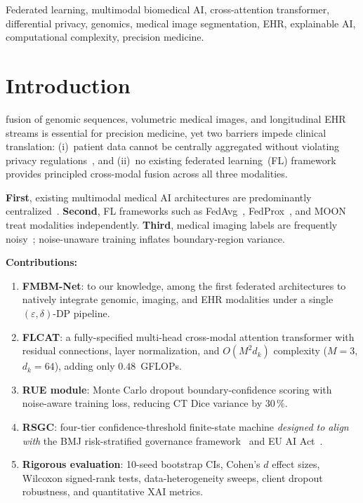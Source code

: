 \documentclass[journal,draftclsnofoot,10pt,onecolumn]{IEEEtran}
\begin{document}
\begin{IEEEkeywords}
Federated learning, multimodal biomedical AI, cross-attention transformer,
differential privacy, genomics, medical image segmentation, EHR,
explainable AI, computational complexity, precision medicine.
\end{IEEEkeywords}

\section{Introduction}
\label{sec:intro}

 fusion of genomic sequences, volumetric medical images,
and longitudinal EHR streams is essential for precision medicine, yet two
barriers impede clinical translation: (i)~patient data cannot be centrally
aggregated without violating privacy regulations~\cite{eu_ai_act_2024,
hipaa_guidance_2024}, and (ii)~no existing federated learning~(FL) framework
provides principled cross-modal fusion across all three modalities.

\textbf{First}, existing multimodal medical AI architectures are predominantly
centralized~\cite{huang2021multimodal}. \textbf{Second}, FL frameworks such as
FedAvg~\cite{mcmahan2017fedavg}, FedProx~\cite{li2020fedprox}, and
MOON~\cite{li2021moon} treat modalities independently.
\textbf{Third}, medical imaging labels are frequently noisy~\cite{rue_ct_2025};
noise-unaware training inflates boundary-region variance.

\textbf{Contributions:}
\begin{enumerate}
\item \textbf{FMBM-Net}: to our knowledge, among the first federated
architectures to natively integrate genomic, imaging, and EHR modalities
under a single $(\varepsilon,\delta)$-DP pipeline.
\item \textbf{FLCAT}: a fully-specified multi-head cross-modal attention
transformer with residual connections, layer normalization, and $O(M^2 d_k)$
complexity ($M\!=\!3$, $d_k\!=\!64$), adding only $0.48$~GFLOPs.
\item \textbf{RUE module}: Monte Carlo dropout boundary-confidence scoring
with noise-aware training loss, reducing CT Dice variance by $30\,\%$.
\item \textbf{RSGC}: four-tier confidence-threshold finite-state machine
\emph{designed to align with} the BMJ risk-stratified governance
framework~\cite{bmj_governance_2026} and EU AI Act~\cite{eu_ai_act_2024}.
\item \textbf{Rigorous evaluation}: 10-seed bootstrap CIs, Cohen's $d$
effect sizes, Wilcoxon signed-rank tests, data-heterogeneity sweeps, client
dropout robustness, and quantitative XAI metrics.
\end{enumerate}
\end{document}
